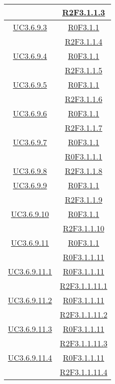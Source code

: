 \begin{longtable}{|c|c|}
& \hyperlink{R2F3.1.1.3}{R2F3.1.1.3}\\
\hline
\hyperlink{UC3.6.9.3}{UC3.6.9.3} & \hyperlink{R0F3.1.1}{R0F3.1.1}\\
& \hyperlink{R2F3.1.1.4}{R2F3.1.1.4}\\
\hline
\hyperlink{UC3.6.9.4}{UC3.6.9.4} & \hyperlink{R0F3.1.1}{R0F3.1.1}\\
& \hyperlink{R2F3.1.1.5}{R2F3.1.1.5}\\
\hline
\hyperlink{UC3.6.9.5}{UC3.6.9.5} & \hyperlink{R0F3.1.1}{R0F3.1.1}\\
& \hyperlink{R2F3.1.1.6}{R2F3.1.1.6}\\
\hline
\hyperlink{UC3.6.9.6}{UC3.6.9.6} & \hyperlink{R0F3.1.1}{R0F3.1.1}\\
& \hyperlink{R2F3.1.1.7}{R2F3.1.1.7}\\
\hline
\hyperlink{UC3.6.9.7}{UC3.6.9.7} & \hyperlink{R0F3.1.1}{R0F3.1.1}\\
& \hyperlink{R0F3.1.1.1}{R0F3.1.1.1}\\
\hline
\hyperlink{UC3.6.9.8}{UC3.6.9.8} & \hyperlink{R2F3.1.1.8}{R2F3.1.1.8}\\
\hline
\hyperlink{UC3.6.9.9}{UC3.6.9.9} & \hyperlink{R0F3.1.1}{R0F3.1.1}\\
& \hyperlink{R2F3.1.1.9}{R2F3.1.1.9}\\
\hline
\hyperlink{UC3.6.9.10}{UC3.6.9.10} & \hyperlink{R0F3.1.1}{R0F3.1.1}\\
& \hyperlink{R2F3.1.1.10}{R2F3.1.1.10}\\
\hline
\hyperlink{UC3.6.9.11}{UC3.6.9.11} & \hyperlink{R0F3.1.1}{R0F3.1.1}\\
& \hyperlink{R0F3.1.1.11}{R0F3.1.1.11}\\
\hline
\hyperlink{UC3.6.9.11.1}{UC3.6.9.11.1} & \hyperlink{R0F3.1.1.11}{R0F3.1.1.11}\\
& \hyperlink{R2F3.1.1.11.1}{R2F3.1.1.11.1}\\
\hline
\hyperlink{UC3.6.9.11.2}{UC3.6.9.11.2} & \hyperlink{R0F3.1.1.11}{R0F3.1.1.11}\\
& \hyperlink{R2F3.1.1.11.2}{R2F3.1.1.11.2}\\
\hline
\hyperlink{UC3.6.9.11.3}{UC3.6.9.11.3} & \hyperlink{R0F3.1.1.11}{R0F3.1.1.11}\\
& \hyperlink{R2F3.1.1.11.3}{R2F3.1.1.11.3}\\
\hline
\hyperlink{UC3.6.9.11.4}{UC3.6.9.11.4} & \hyperlink{R0F3.1.1.11}{R0F3.1.1.11}\\
& \hyperlink{R2F3.1.1.11.4}{R2F3.1.1.11.4}\\

\end{longtable}
